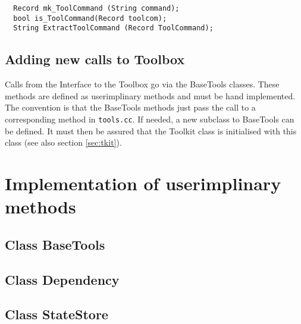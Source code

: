 \documentclass[11pt]{article}
\begin{document}
\begin{verbatim}
  Record mk_ToolCommand (String command);
  bool is_ToolCommand(Record toolcom); 
  String ExtractToolCommand (Record ToolCommand);
\end{verbatim}

\subsection{Adding new calls to Toolbox}
\label{sec:newcall}
 
Calls from the Interface to the Toolbox go via the BaseTools classes.
These methods are defined as userimplinary methods and must be hand
implemented. The convention is that the BaseTools methods just pass
the call to a corresponding method in \texttt{tools.cc}. If needed, a
new subclass to BaseTools can be defined. It must then be assured that
the Toolkit class is initialised with this class (see also section
\ref{sec:tkit}).
  
\appendix


\section{Implementation of userimplinary methods}
\label{sec:impuserimpl}

\subsection{Class BaseTools}
\label{sec:basetoolsuserimpl}
\small
{}




\subsection{Class Dependency}
\label{sec:depuserimpl}



\subsection{Class StateStore}
\label{sec:storeuserimpl}
\end{document}
